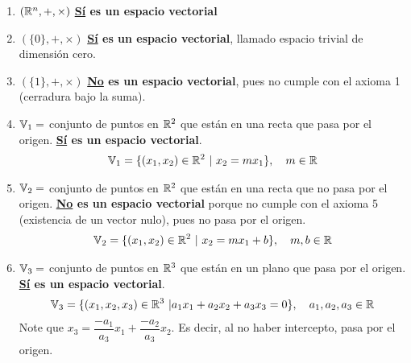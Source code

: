 \begin{enumerate}
    \renewcommand{\labelenumi}{\textbf{\arabic{enumi})}}
    \item $(\mathbb{R}^n, +, \times)$ \textbf{\underline{Sí} es un espacio vectorial}

    \item $(\{0\}, +, \times)$ \textbf{\underline{Sí} es un espacio vectorial}, llamado espacio trivial de dimensión cero.

    \item $(\{1\}, +, \times)$ \textbf{\underline{No} es un espacio vectorial}, pues no cumple con el axioma 1 (cerradura bajo la suma).

    \item $\mathbb{V}_1 =$ conjunto de puntos en $\mathbb{R}^2$ que están en una recta que pasa por el origen. \textbf{\underline{Sí} es un espacio vectorial}. \begin{align*}
        \mathbb{V}_1 = \{ (x_1, x_2) \in \mathbb{R}^2 \ | \ x_2 = m x_1 \}, \quad m \in \mathbb{R}
    \end{align*}

    \item $\mathbb{V}_2 =$ conjunto de puntos en $\mathbb{R}^2$ que están en una recta que no pasa por el origen. \textbf{\underline{No} es un espacio vectorial} porque no cumple con el axioma 5 (existencia de un vector nulo), pues no pasa por el origen. \begin{align*}
        \mathbb{V}_2 = \{ (x_1, x_2) \in \mathbb{R}^2 \ | \ x_2 = m x_1 + b \}, \quad m, b \in \mathbb{R}
    \end{align*}

    \item $\mathbb{V}_3 =$ conjunto de puntos en $\mathbb{R}^3$ que están en un plano que pasa por el origen. \textbf{\underline{Sí} es un espacio vectorial}. \begin{align*}
        \mathbb{V}_3 = \{ (x_1, x_2, x_3) \in \mathbb{R}^3 \ | a_1 x_1 + a_2 x_2 + a_3 x_3 = 0 \}, \quad a_1, a_2, a_3 \in \mathbb{R}
    \end{align*}
    Note que $x_3 = \dfrac{-a_1}{a_3}x_1 + \dfrac{-a_2}{a_3}x_2$. Es decir, al no haber intercepto, pasa por el origen.

    \begin{note}
        [
            En el caso de los polinomios, decir que "pasa por el cero" significa que $y=0$ y no que pasa por el origen. Por ejemplo, el polinomio $y = 2x + 3$ pasa por el cero, pero no pasa por el origen.
        ]
    \end{note}


\end{enumerate}
